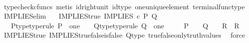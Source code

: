 \begin{isabellebody}
\ \ \ \ \isamarkupfalse%
\ {\isacharparenleft}{\kern0pt}typecheck{\isacharunderscore}{\kern0pt}cfuncs{\isacharcomma}{\kern0pt}\ metis\ id{\isacharunderscore}{\kern0pt}right{\isacharunderscore}{\kern0pt}unit{}\ id{\isacharunderscore}{\kern0pt}type\ one{\isacharunderscore}{\kern0pt}unique{\isacharunderscore}{\kern0pt}element\ terminal{\isacharunderscore}{\kern0pt}func{\isacharunderscore}{\kern0pt}type{\isacharparenright}{\kern0pt}\isanewline
{}\isamarkupfalse%
%
\endisatagproof
{\isafoldproof}%
%
\isadelimproof
\isanewline
%
\endisadelimproof
\isanewline
{}\isamarkupfalse%
\ IMPLIES{\isacharunderscore}{\kern0pt}elim{\isacharprime}{\kern0pt}{\isacharcolon}{\kern0pt}\isanewline
\ \ \ IMPLIES{\isacharunderscore}{\kern0pt}true{\isacharcolon}{\kern0pt}\ {\isachardoublequoteopen}IMPLIES\ {\isasymcirc}\isactrlsub c\ {\isasymlangle}P{\isacharcomma}{\kern0pt}\ Q{\isasymrangle}\ {\isacharequal}{\kern0pt}\ {\isasymt}{\isachardoublequoteclose}\isanewline
\ \ \ P{\isacharunderscore}{\kern0pt}type{\isacharbrackleft}{\kern0pt}type{\isacharunderscore}{\kern0pt}rule{\isacharbrackright}{\kern0pt}{\isacharcolon}{\kern0pt}\ {\isachardoublequoteopen}P\ {\isacharcolon}{\kern0pt}\ one\ {\isasymrightarrow}\ {\isasymOmega}{\isachardoublequoteclose}\ \ Q{\isacharunderscore}{\kern0pt}type{\isacharbrackleft}{\kern0pt}type{\isacharunderscore}{\kern0pt}rule{\isacharbrackright}{\kern0pt}{\isacharcolon}{\kern0pt}\ {\isachardoublequoteopen}Q\ {\isacharcolon}{\kern0pt}\ one\ {\isasymrightarrow}\ {\isasymOmega}{\isachardoublequoteclose}\isanewline
\ \ \ {\isachardoublequoteopen}{\isacharparenleft}{\kern0pt}P\ {\isacharequal}{\kern0pt}\ {\isasymt}{\isacharparenright}{\kern0pt}\ {\isasymLongrightarrow}\ {\isacharparenleft}{\kern0pt}{\isacharparenleft}{\kern0pt}Q\ {\isacharequal}{\kern0pt}\ {\isasymt}{\isacharparenright}{\kern0pt}\ {\isasymLongrightarrow}\ R{\isacharparenright}{\kern0pt}\ {\isasymLongrightarrow}\ R{\isachardoublequoteclose}\isanewline
%
\isadelimproof
\ \ %
\endisadelimproof
%
\isatagproof
{}\isamarkupfalse%
\ IMPLIES{\isacharunderscore}{\kern0pt}true\ IMPLIES{\isacharunderscore}{\kern0pt}true{\isacharunderscore}{\kern0pt}false{\isacharunderscore}{\kern0pt}is{\isacharunderscore}{\kern0pt}false\ Q{\isacharunderscore}{\kern0pt}type\ true{\isacharunderscore}{\kern0pt}false{\isacharunderscore}{\kern0pt}only{\isacharunderscore}{\kern0pt}truth{\isacharunderscore}{\kern0pt}values\ \isamarkupfalse%
\ force%
\endisatagproof
{\isafoldproof}%

\end{isabellebody}

